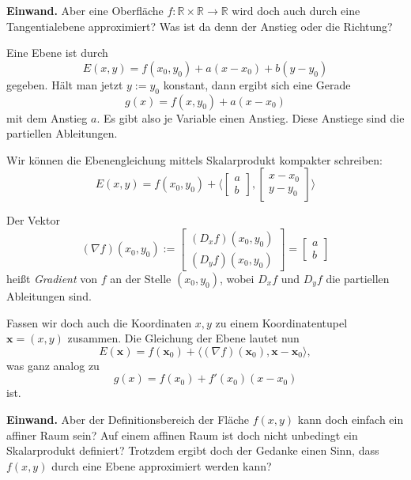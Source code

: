 \documentclass{beamer}
\newcommand{\R}{\mathbb R}
\begin{document}
\begin{frame}
\textbf{Einwand.}
Aber eine Oberfläche $f\colon\R\times\R\to\R$ wird doch auch durch
eine Tangentialebene approximiert? Was ist da denn der Anstieg
oder die Richtung?
\end{frame}

\begin{frame}
Eine Ebene ist durch
\[E(x,y) = f(x_0,y_0)+a(x-x_0)+b(y-y_0)\]
gegeben. Hält man jetzt $y:=y_0$ konstant, dann ergibt sich eine
Gerade
\[g(x) = f(x,y_0)+a(x-x_0)\]
mit dem Anstieg $a$. Es gibt also je Variable einen Anstieg. Diese
Anstiege sind die partiellen Ableitungen.
\end{frame}

\begin{frame}
Wir können die Ebenengleichung mittels Skalarprodukt kompakter schreiben:
\[E(x,y) = f(x_0,y_0) + \langle\begin{bmatrix}a\\ b\end{bmatrix},
\begin{bmatrix}x-x_0\\ y-y_0\end{bmatrix}\rangle\]
\end{frame}

\begin{frame}
Der Vektor
\[(\nabla f)(x_0,y_0) := \begin{bmatrix}(D_x f)(x_0,y_0)\\ (D_y f)(x_0,y_0)\end{bmatrix}
= \begin{bmatrix}a\\ b\end{bmatrix}\]
heißt \emph{Gradient} von $f$ an der Stelle $(x_0,y_0)$, wobei $D_x f$
und $D_y f$ die partiellen Ableitungen sind.
\end{frame}

\begin{frame}
Fassen wir doch auch die Koordinaten $x,y$ zu einem Koordinatentupel $\mathbf x = (x,y)$
zusammen. Die Gleichung der Ebene lautet nun
\[E(\mathbf x) = f(\mathbf x_0) + \langle(\nabla f)(\mathbf x_0),\mathbf x-\mathbf x_0\rangle,\]
was ganz analog zu
\[g(x) = f(x_0) + f'(x_0)(x-x_0)\]
ist.
\end{frame}

\begin{frame}
\textbf{Einwand.}
Aber der Definitionsbereich der Fläche $f(x,y)$ kann doch einfach ein
affiner Raum sein? Auf einem affinen Raum ist doch nicht unbedingt ein
Skalarprodukt definiert? Trotzdem ergibt doch der Gedanke einen Sinn,
dass $f(x,y)$ durch eine Ebene approximiert werden kann?
\end{frame}
\end{document}
